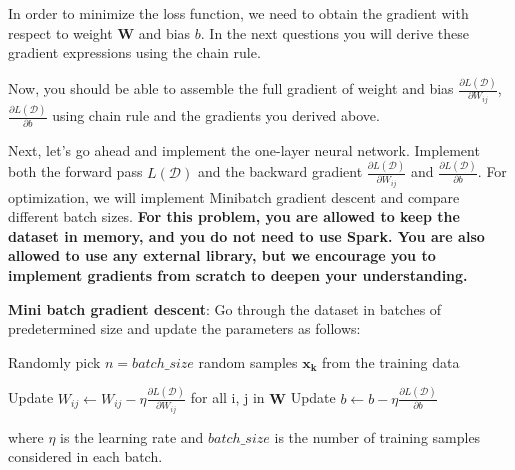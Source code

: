 In order to minimize the loss function, we need to obtain the gradient with respect to weight $\mathbf{W}$ and bias $b$. In the next questions you will derive these gradient expressions using the chain rule.








\bigskip

Now, you should be able to assemble the full gradient of weight and bias $\frac{\partial L(\mathcal{D})}{\partial W_{ij}}$, $\frac{\partial L(\mathcal{D})}{\partial b}$ using chain rule and the gradients you derived above. 


Next, let's go ahead and implement the one-layer neural network. Implement both the forward pass $L(\mathcal{D})$ and the backward gradient $\frac{\partial L(\mathcal{D})}{\partial W_{ij}}$ and $\frac{\partial L(\mathcal{D})}{\partial b}$. For optimization, we will implement Minibatch gradient descent and compare different batch sizes. \textbf{For this problem, you are allowed to keep the dataset in memory, and you do not need to use Spark. You are also allowed to use any external library, but we encourage you to implement gradients from scratch to deepen your understanding.}

\bigskip


\textbf{Mini batch gradient descent}: Go through the dataset in batches of predetermined size and update the parameters as follows:
\begin{algorithmic}
\STATE Randomly pick $n=batch\_size$ random samples $\mathbf{x_k}$ from the training data

\STATE Update $W_{ij} \leftarrow W_{ij} - \eta \frac{\partial L(\mathcal{D})}{\partial W_{ij}}$ for all i, j in $\mathbf{W}$
\STATE Update $b \leftarrow b - \eta \frac{\partial L(\mathcal{D})}{\partial b}$
\ENDFOR
\ENDWHILE
\end{algorithmic}
where $\eta$ is the learning rate and $batch\_size$ is the number of training samples considered in each batch. \\

